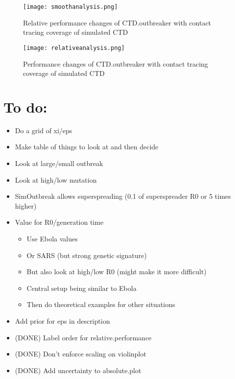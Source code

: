 \documentclass{article}
\begin{document}
	\begin{figure}[H]
		\centering
		\texttt{[image: smoothanalysis.png]}
		\caption{Relative performance changes of CTD.outbreaker with contact tracing coverage of simulated CTD}
	\end{figure}
		
	\begin{figure}[H]
		\centering
		\texttt{[image: relativeanalysis.png]}
		\caption{Performance changes of CTD.outbreaker with contact tracing coverage of simulated CTD}
	\end{figure}	
	
	\section{To do:}
		
	\begin{itemize}
		\item Do a grid of xi/eps
		\item Make table of things to look at and then decide
		\item Look at large/small outbreak
		\item Look at high/low mutation
		\item SimOutbreak allows superspreading (0.1 of superspreader R0 or 5 times higher)
		\item Value for R0/generation time
		\begin{itemize}
			\item Use Ebola values
			\item Or SARS (but strong genetic signature)
			\item But also look at high/low R0 (might make it more difficult)
			\item Central setup being similar to Ebola
			\item Then do theoretical examples for other situations
		\end{itemize}
		\item Add prior for eps in description
		\item (DONE) Label order for relative.performance
		\item (DONE) Don't enforce scaling on violinplot
		\item (DONE) Add uncertainty to absolute.plot
		
	\end{itemize}
	
	
\end{document}
